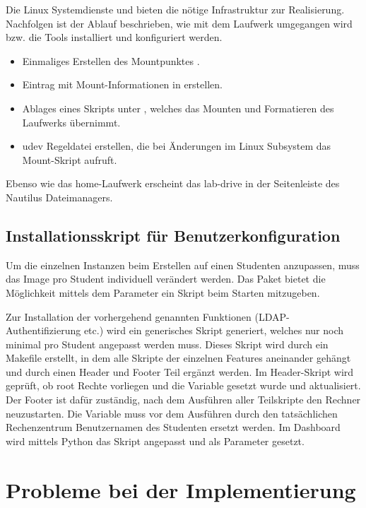 Die Linux Systemdienste  und  bieten die nötige Infrastruktur zur Realisierung.
Nachfolgen ist der Ablauf beschrieben, wie mit dem Laufwerk umgegangen wird bzw. die Tools installiert und konfiguriert werden.

\begin{itemize}
\item Einmaliges Erstellen des Mountpunktes .
\item Eintrag mit Mount-Informationen in  erstellen.
\item Ablages eines Skripts unter , welches das Mounten und Formatieren des Laufwerks übernimmt.
\item udev Regeldatei erstellen, die bei Änderungen im Linux Subsystem  das Mount-Skript aufruft.
\end{itemize}

Ebenso wie das home-Laufwerk erscheint das lab-drive in der Seitenleiste des Nautilus Dateimanagers.

\subsection{Installationsskript  für Benutzerkonfiguration}

Um die einzelnen Instanzen beim Erstellen auf einen Studenten anzupassen, muss das Image pro Student individuell verändert werden. 
Das  Paket bietet die Möglichkeit mittels dem Parameter  ein Skript beim Starten mitzugeben. 

Zur Installation der vorhergehend genannten Funktionen (LDAP-Authentifizierung etc.) wird ein generisches Skript generiert, welches nur noch minimal pro Student angepasst werden muss.
Dieses Skript  wird durch ein Makefile erstellt, in dem alle  Skripte der einzelnen Features aneinander gehängt und durch einen Header und Footer Teil ergänzt werden.
Im Header-Skript wird geprüft, ob root Rechte vorliegen und die  Variable gesetzt wurde und  aktualisiert. 
Der Footer ist dafür zuständig, nach dem Ausführen aller Teilskripte den Rechner neuzustarten.
Die  Variable muss vor dem Ausführen durch den tatsächlichen Rechenzentrum Benutzernamen des Studenten ersetzt werden.
Im Dashboard wird mittels Python das Skript angepasst und als  Parameter gesetzt.

\section{Probleme bei der Implementierung}

